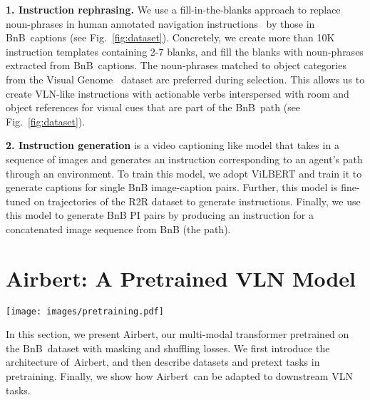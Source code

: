 \RequirePackage[dvipsnames,table]{xcolor} \documentclass[10pt,twocolumn,letterpaper]{article}
\newcommand{\p}[1]{\vspace{1mm}\noindent\textbf{#1}}
\newcommand{\airbert}{Airbert}
\newcommand{\airbnb}{BnB}
\begin{document}
\p{1. Instruction rephrasing.}
We use a fill-in-the-blanks approach to replace noun-phrases in human annotated navigation instructions~\cite{anderson2018r2r} by those in \airbnb~captions (see Fig.~\ref{fig:dataset}).
Concretely, we create more than 10K instruction templates containing 2-7 blanks, and fill the blanks with noun-phrases extracted from \airbnb~captions.
The noun-phrases matched to object categories from the Visual Genome~\cite{krishna2017vg} dataset are preferred during selection.
This allows us to create VLN-like instructions with actionable verbs interspersed with room and object references for visual cues that are part of the \airbnb~path (see Fig.~\ref{fig:dataset}).






\p{2. Instruction generation} is a video captioning like model that takes in a sequence of images and generates an instruction corresponding to an agent's path through an environment.
To train this model, we adopt ViLBERT and train it to generate captions for single BnB image-caption pairs.
Further, this model is fine-tuned on trajectories of the R2R dataset to generate instructions.
Finally, we use this model to generate BnB PI pairs by producing an instruction for a concatenated image sequence from BnB (the path).



 \section{\airbert: A Pretrained VLN Model}
\label{sec:airbert}

\begin{figure*}
\centering
\texttt{[image: images/pretraining.pdf]}
\caption{Overview of our pretraining approach.
Instead of the usual VL pretraining (panel 1), we adopt in-domain data and use the path-instruction pairs to train \airbert~with the masking and shuffling losses (panel 2).
We fine-tune Airbert on downstream VLN tasks using both discriminative or generative models (panel 3).
}
\vspace{1mm}
\label{fig:model}
\end{figure*}

In this section, we present \airbert, our multi-modal transformer pretrained on the \airbnb~dataset with masking and shuffling losses.
We first introduce the architecture of~\airbert, and then describe datasets and pretext tasks in pretraining.
Finally, we show how \airbert~can be adapted to downstream VLN tasks.
\end{document}
